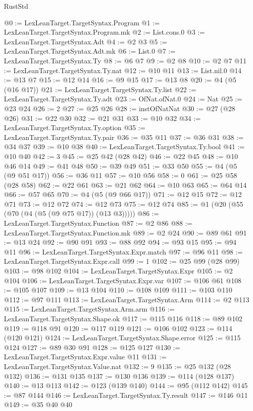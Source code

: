 \begin{lexlean}{RustStd}
\begin{coremodule}
@0 := LexLeanTarget.TargetSyntax.Program
@1 := LexLeanTarget.TargetSyntax.Program.mk
@2 := List.cons.{0}
@3 := LexLeanTarget.TargetSyntax.Adt
@4 := @2 @3
@5 := LexLeanTarget.TargetSyntax.Adt.mk
@6 := List.{0}
@7 := LexLeanTarget.TargetSyntax.Ty
@8 := @6 @7
@9 := @2 @8
@10 := @2 @7
@11 := LexLeanTarget.TargetSyntax.Ty.nat
@12 := @10 @11
@13 := List.nil.{0}
@14 := @13 @7
@15 := @12 @14
@16 := @9 @15
@17 := @13 @8
@20 := @4 (@5 (@16 @17))
@21 := LexLeanTarget.TargetSyntax.Ty.list
@22 := LexLeanTarget.TargetSyntax.Ty.adt
@23 := OfNat.ofNat.{0}
@24 := Nat
@25 := @23 @24
@26 := 2
@27 := @25 @26
@28 := instOfNatNat
@30 := @27 (@28 @26)
@31 := @22 @30
@32 := @21 @31
@33 := @10 @32
@34 := LexLeanTarget.TargetSyntax.Ty.option
@35 := LexLeanTarget.TargetSyntax.Ty.pair
@36 := @35 @11
@37 := @36 @31
@38 := @34 @37
@39 := @10 @38
@40 := LexLeanTarget.TargetSyntax.Ty.bool
@41 := @10 @40
@42 := 3
@45 := @25 @42 (@28 @42)
@46 := @22 @45
@48 := @10 @46 @14
@49 := @41 @48
@50 := @39 @49
@51 := @33 @50
@55 := @4 (@5 (@9 @51 @17))
@56 := @36 @11
@57 := @10 @56
@58 := 0
@61 := @25 @58 (@28 @58)
@62 := @22 @61
@63 := @21 @62
@64 := @10 @63
@65 := @64 @14
@66 := @57 @65
@70 := @4 (@5 (@9 @66 @17))
@71 := @12 @15
@72 := @12 @71
@73 := @12 @72
@74 := @12 @73
@75 := @12 @74
@85 := @1 (@20 (@55 (@70 (@4 (@5 (@9 @75 @17)) (@13 @3)))))
@86 := LexLeanTarget.TargetSyntax.Function
@87 := @2 @86
@88 := LexLeanTarget.TargetSyntax.Function.mk
@89 := @2 @24
@90 := @89 @61
@91 := @13 @24
@92 := @90 @91
@93 := @88 @92
@94 := @93 @15
@95 := @94 @11
@96 := LexLeanTarget.TargetSyntax.Expr.match
@97 := @96 @11
@98 := LexLeanTarget.TargetSyntax.Expr.call
@99 := 1
@102 := @25 @99 (@28 @99)
@103 := @98 @102
@104 := LexLeanTarget.TargetSyntax.Expr
@105 := @2 @104
@106 := LexLeanTarget.TargetSyntax.Expr.var
@107 := @106 @61
@108 := @105 @107
@109 := @13 @104
@110 := @108 @109
@111 := @103 @110
@112 := @97 @111
@113 := LexLeanTarget.TargetSyntax.Arm
@114 := @2 @113
@115 := LexLeanTarget.TargetSyntax.Arm.arm
@116 := LexLeanTarget.TargetSyntax.Shape.ok
@117 := @115 @116
@118 := @89 @102
@119 := @118 @91
@120 := @117 @119
@121 := @106 @102
@123 := @114 (@120 @121)
@124 := LexLeanTarget.TargetSyntax.Shape.error
@125 := @115 @124
@127 := @89 @30 @91
@128 := @125 @127
@130 := LexLeanTarget.TargetSyntax.Expr.value @11
@131 := LexLeanTarget.TargetSyntax.Value.nat
@132 := 9
@135 := @25 @132 (@28 @132)
@136 := @131 @135
@137 := @130 @136
@139 := @114 (@128 @137)
@140 := @13 @113
@142 := @123 (@139 @140)
@144 := @95 (@112 @142)
@145 := @87 @144
@146 := LexLeanTarget.TargetSyntax.Ty.result
@147 := @146 @11
@149 := @35 @40 @40

\end{coremodule}
\end{lexlean}

